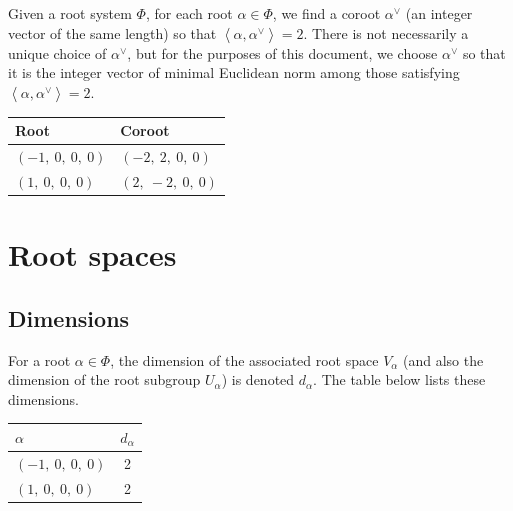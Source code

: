 \documentclass[11pt]{article}
\newcommand{\noi}{\noindent}
\newcommand{\la}{\left\langle}
\newcommand{\ra}{\right\rangle}
\theoremstyle{definition}
\newtheorem{definition}{Definition}[section]
\newif\ifsummablepairs
\begin{document}
Given a root system $\Phi$, for each root $\alpha \in \Phi$, we find a coroot $\alpha^\vee$ (an integer vector of the same length) so that $\la \alpha, \alpha^\vee \ra = 2$. There is not necessarily a unique choice of $\alpha^\vee$, but for the purposes of this document, we choose $\alpha^\vee$ so that it is the integer vector of minimal Euclidean norm among those satisfying $\la \alpha, \alpha^\vee \ra = 2$.

\bigskip

\noindent \begin{tabular}{|l|l|}
    \hline
    \textbf{Root} & \textbf{Coroot} \\
    \hline
    $\left( -1, \  0, \  0, \  0\right)$ & $\left( -2, \  2, \  0, \  0\right)$ \\
    \hline
    $\left( 1, \  0, \  0, \  0\right)$ & $\left( 2, \  -2, \  0, \  0\right)$ \\
    \hline
\end{tabular}


\ifsummablepairs
\subsection{Linear combinations of roots}

\begin{definition}
For two roots $\alpha, \beta$ in a root system $\Phi$, the set of positive integral linear combinations of $\alpha, \beta$ that are also roots is denoted
\(
	(\alpha, \beta) = \{ i \alpha + j \beta \in \Phi : i, j \in \mathbb{Z}_{\ge 1} \}
\).
\end{definition}
\noi 
\fi

\newpage
\section{Root spaces}

\subsection{Dimensions}

For a root $\alpha \in \Phi$, the dimension of the associated root space $V_\alpha$ (and also the dimension of the root subgroup $U_\alpha$) is denoted $d_\alpha$. The table below lists these dimensions.

\bigskip

\noindent \begin{tabular}{|l|c|}
    \hline
    \textbf{$\alpha$} & \textbf{$d_{\alpha}$} \\
    \hline
    $\left( -1, \  0, \  0, \  0\right)$ & 2 \\
    \hline
    $\left( 1, \  0, \  0, \  0\right)$ & 2 \\
    \hline
\end{tabular}
\end{document}
